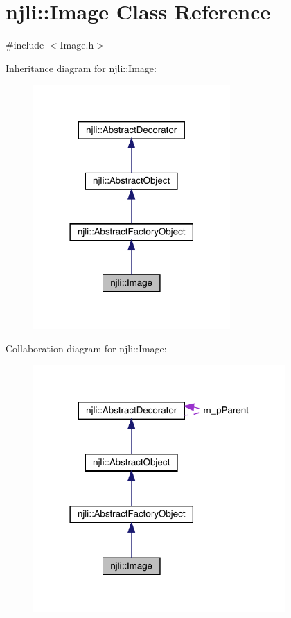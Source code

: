 \hypertarget{classnjli_1_1_image}{}\section{njli\+:\+:Image Class Reference}
\label{classnjli_1_1_image}


{\ttfamily \#include $<$Image.\+h$>$}



Inheritance diagram for njli\+:\+:Image\+:\nopagebreak
\begin{figure}[H]
\begin{center}
\leavevmode
\includegraphics[width=213pt]{classnjli_1_1_image__inherit__graph}
\end{center}
\end{figure}


Collaboration diagram for njli\+:\+:Image\+:\nopagebreak
\begin{figure}[H]
\begin{center}
\leavevmode
\includegraphics[width=273pt]{classnjli_1_1_image__coll__graph}
\end{center}
\end{figure}
